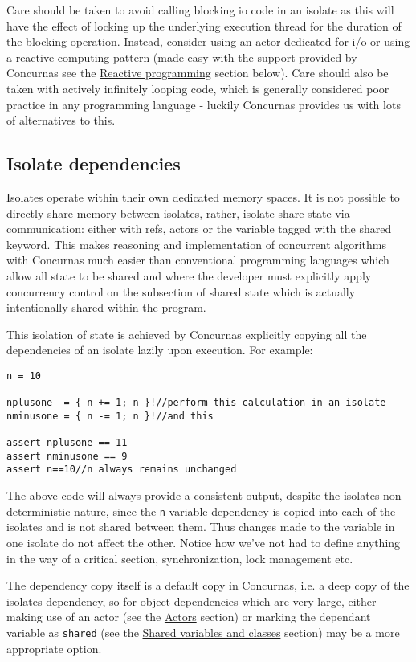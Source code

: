 \documentclass[conc-doc]{subfiles}
\begin{document}
Care should be taken to avoid calling blocking io code in an isolate as this will have the effect of locking up the underlying execution thread for the duration of the blocking operation. Instead, consider using an actor dedicated for i/o or using a reactive computing pattern (made easy with the support provided by Concurnas see the \hyperref[sec:reactive]{Reactive programming} section below). Care should also be taken with actively infinitely looping code, which is generally considered poor practice in any programming language - luckily Concurnas provides us with lots of alternatives to this.


\subsection{Isolate dependencies}
Isolates operate within their own dedicated memory spaces. It is not possible to directly share memory between isolates, rather, isolate share state via communication: either with refs, actors or the variable tagged with the shared keyword. This makes reasoning and implementation of concurrent algorithms with Concurnas much easier than conventional programming languages which allow all state to be shared and where the developer must explicitly apply concurrency control on the subsection of shared state which is actually intentionally shared within the program.

This isolation of state is achieved by Concurnas explicitly copying all the dependencies of an isolate lazily upon execution. For example:

\begin{lstlisting}
n = 10

nplusone  = { n += 1; n }!//perform this calculation in an isolate
nminusone = { n -= 1; n }!//and this

assert nplusone == 11
assert nminusone == 9
assert n==10//n always remains unchanged
\end{lstlisting}

The above code will always provide a consistent output, despite the isolates non deterministic nature, since the \lstinline{n} variable dependency is copied into each of the isolates and is not shared between them. Thus changes made to the variable in one isolate do not affect the other. Notice how we've not had to define anything in the way of a critical section, synchronization, lock management etc.

The dependency copy itself is a default copy in Concurnas, i.e. a deep copy of the isolates dependency, so for object dependencies which are very large, either making use of an actor (see the \hyperref[sec:actors]{Actors} section) or marking the dependant variable as \lstinline{shared} (see the \hyperref[sec:shared]{Shared variables and classes} section) may be a more appropriate option.
\end{document}
